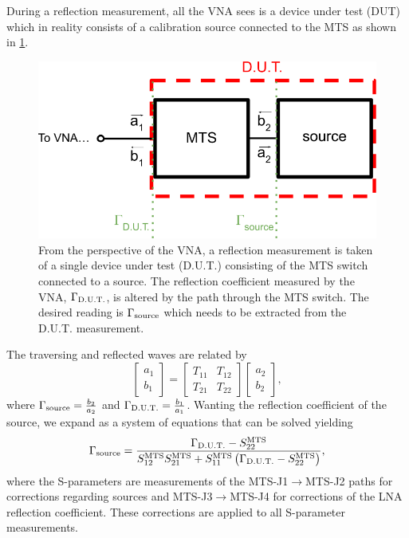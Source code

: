 During a reflection measurement, all the VNA sees is a device under test (DUT) which in reality consists of a calibration source connected to the MTS as shown in \cref{fig:cascaded_network_diagram}. 
\begin{figure}
    \centering
    \includegraphics[width=.9\textwidth]{cascaded_network_diagram}
    \caption{From the perspective of the VNA, a reflection measurement is taken of a single device under test (D.U.T.) consisting of the MTS switch connected to a source. The reflection coefficient measured by the VNA, $\Gamma_{\mathrm{\mathrm{D.U.T.}}}$, is altered by the path through the MTS switch. The desired reading is $\Gamma_{\mathrm{\mathrm{source}}}$ which needs to be extracted from the D.U.T. measurement.}
    \label{fig:cascaded_network_diagram}
\end{figure}
The traversing and reflected waves are related by
\begin{equation}
    \begin{bmatrix}
        a_1 \\ b_1
    \end{bmatrix}
    =
    \begin{bmatrix}
        T_{11} & T_{12} \\
        T_{21} & T_{22}
    \end{bmatrix}
    \begin{bmatrix}
        a_2 \\ b_2
    \end{bmatrix},
\end{equation}
where $\Gamma_{\mathrm{\mathrm{source}}} = \frac{b_2}{a_2}$ and $\Gamma_{\mathrm{\mathrm{D.U.T.}}} = \frac{b_1}{a_1}$. Wanting the reflection coefficient of the source, we expand as a system of equations that can be solved yielding
\begin{equation}
    \Gamma_{\mathrm{source}} = \frac{ \Gamma_{\mathrm{\mathrm{D.U.T.}}} - S_{22}^{\mathrm{MTS}} }{ S_{12}^{\mathrm{MTS}} S_{21}^{\mathrm{MTS}} + S_{11}^{\mathrm{MTS}} \left( \Gamma_{\mathrm{\mathrm{D.U.T.}}} - S_{22}^{\mathrm{MTS}} \right) },
\end{equation}
where the S-parameters are measurements of the MTS-J1$\rightarrow$MTS-J2 paths for corrections regarding sources and MTS-J3$\rightarrow$MTS-J4 for corrections of the LNA reflection coefficient. These corrections are applied to all S-parameter measurements.

